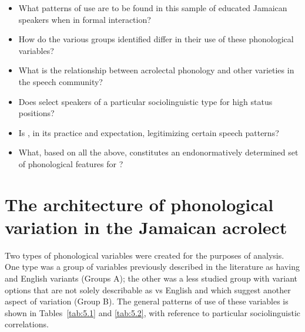 \begin{itemize}
\item What patterns of use are to be found in this sample of educated Jamaican speakers when in formal interaction?
\item How do the various groups identified differ in their use of these phonological variables?
\item What is the relationship between acrolectal phonology and other varieties in the speech community? 
\item Does  select speakers of a particular sociolinguistic type for high status positions?
\item Is , in its practice and expectation, legitimizing certain speech patterns?
\item What, based on all the above, constitutes an endonormatively determined set of phonological features for ?
\end{itemize}

\section{The architecture of phonological variation in the Jamaican acrolect}\label{sec:5.1}

Two types of phonological variables were created for the purposes of analysis.  One type was a group of variables previously described in the literature as having  and English variants (Groups A); the other was a less studied group with variant options that are not solely describable as  vs English and which suggest another aspect of  variation (Group B).  The general patterns of use of these variables is shown in Tables~\ref{tab:5.1} and \ref{tab:5.2}, with reference to particular sociolinguistic correlations.      

